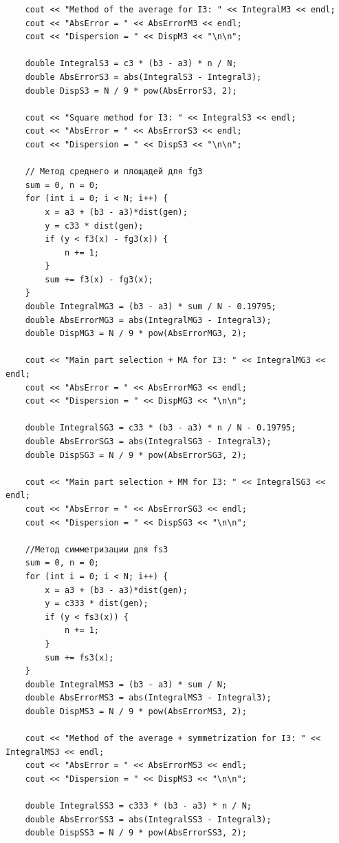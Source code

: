 \documentclass[
11pt,
master, %
subf, %
href, %
colorlinks=true, %
times, %
]{disser}
\begin{document}
{\begin{verbatim}
    cout << "Method of the average for I3: " << IntegralM3 << endl;
    cout << "AbsError = " << AbsErrorM3 << endl;
    cout << "Dispersion = " << DispM3 << "\n\n";

    double IntegralS3 = c3 * (b3 - a3) * n / N;
    double AbsErrorS3 = abs(IntegralS3 - Integral3);
    double DispS3 = N / 9 * pow(AbsErrorS3, 2);

    cout << "Square method for I3: " << IntegralS3 << endl;
    cout << "AbsError = " << AbsErrorS3 << endl;
    cout << "Dispersion = " << DispS3 << "\n\n";

    // Метод среднего и площадей для fg3
    sum = 0, n = 0;
    for (int i = 0; i < N; i++) {
        x = a3 + (b3 - a3)*dist(gen);
        y = c33 * dist(gen);
        if (y < f3(x) - fg3(x)) {
            n += 1;
        }
        sum += f3(x) - fg3(x);
    }
    double IntegralMG3 = (b3 - a3) * sum / N - 0.19795;
    double AbsErrorMG3 = abs(IntegralMG3 - Integral3);
    double DispMG3 = N / 9 * pow(AbsErrorMG3, 2);

    cout << "Main part selection + MA for I3: " << IntegralMG3 << endl;
    cout << "AbsError = " << AbsErrorMG3 << endl;
    cout << "Dispersion = " << DispMG3 << "\n\n";

    double IntegralSG3 = c33 * (b3 - a3) * n / N - 0.19795;
    double AbsErrorSG3 = abs(IntegralSG3 - Integral3);
    double DispSG3 = N / 9 * pow(AbsErrorSG3, 2);

    cout << "Main part selection + MM for I3: " << IntegralSG3 << endl;
    cout << "AbsError = " << AbsErrorSG3 << endl;
    cout << "Dispersion = " << DispSG3 << "\n\n";

    //Метод симметризации для fs3
    sum = 0, n = 0;
    for (int i = 0; i < N; i++) {
        x = a3 + (b3 - a3)*dist(gen);
        y = c333 * dist(gen);
        if (y < fs3(x)) {
            n += 1;
        }
        sum += fs3(x);
    }
    double IntegralMS3 = (b3 - a3) * sum / N;
    double AbsErrorMS3 = abs(IntegralMS3 - Integral3);
    double DispMS3 = N / 9 * pow(AbsErrorMS3, 2);

    cout << "Method of the average + symmetrization for I3: " << IntegralMS3 << endl;
    cout << "AbsError = " << AbsErrorMS3 << endl;
    cout << "Dispersion = " << DispMS3 << "\n\n";

    double IntegralSS3 = c333 * (b3 - a3) * n / N;
    double AbsErrorSS3 = abs(IntegralSS3 - Integral3);
    double DispSS3 = N / 9 * pow(AbsErrorSS3, 2);


\end{verbatim}}
\end{document}
